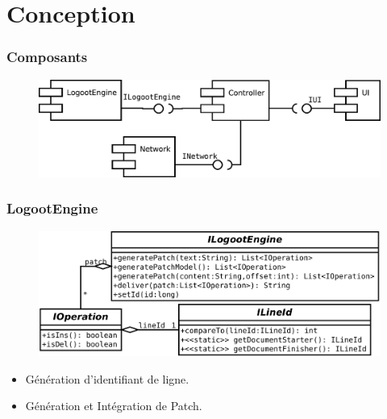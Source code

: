 \section{Conception}
  \begin{frame}
    \frametitle{Composants}
    \begin{figure}
    \center
		\includegraphics[scale=.5]{includes/model/architecture.pdf}
    \end{figure}
  \end{frame}

  \begin{frame}
    \frametitle{LogootEngine}
    \begin{figure}
    \center
		\includegraphics[scale=.3]{includes/model/ILogootEngine.pdf}
    \end{figure}
    \begin{itemize}
      \item Génération d'identifiant de ligne.
      \item Génération et Intégration de Patch.
    \end{itemize}
  \end{frame}


